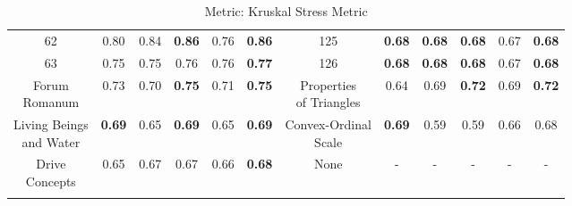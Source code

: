 \documentclass{article}
\begin{document}
{\begin{longtable}{cccccc@{\qquad}cccccc}
62 & 0.80 & 0.84 & \textbf{0.86} & 0.76 & \textbf{0.86} & 125 & \textbf{0.68} & \textbf{0.68} & \textbf{0.68} & 0.67 & \textbf{0.68} \\
63 & 0.75 & 0.75 & 0.76 & 0.76 & \textbf{0.77} & 126 & \textbf{0.68} & \textbf{0.68} & \textbf{0.68} & 0.67 & \textbf{0.68} \\
\makecell[c]{Forum \\ Romanum} & 0.73 & 0.70 & \textbf{0.75} & 0.71 & \textbf{0.75} & \makecell[c]{Properties \\ of Triangles} & 0.64 & 0.69 & \textbf{0.72} & 0.69 & \textbf{0.72} \\
\makecell[c]{Living Beings \\ and Water} & \textbf{0.69} & 0.65 & \textbf{0.69} & 0.65 & \textbf{0.69} & \makecell[c]{Convex-Ordinal \\ Scale} & \textbf{0.69} & 0.59 & 0.59 & 0.66 & 0.68 \\
\makecell[c]{Drive \\ Concepts} & 0.65 & 0.67 & 0.67 & 0.66 & \textbf{0.68} & None & - & - & - & - & - \\
\caption{Metric: Kruskal Stress Metric} \\
\end{longtable}
}
\clearpage
\end{document}
